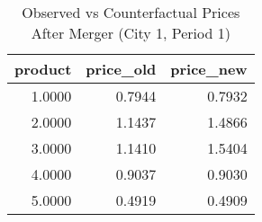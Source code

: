 \begin{table}[htbp]
    \centering
    \caption{Observed vs Counterfactual Prices After Merger (City 1, Period 1)}
    \label{tab:q11_prices_counterfactual_city1_period1}
\toprule
\begin{tabular}{rrr}
\toprule
product & price_old & price_new \\
\midrule
\midrule
1.0000 & 0.7944 & 0.7932 \\
2.0000 & 1.1437 & 1.4866 \\
3.0000 & 1.1410 & 1.5404 \\
4.0000 & 0.9037 & 0.9030 \\
5.0000 & 0.4919 & 0.4909 \\
\bottomrule
\bottomrule
\end{tabular}

\end{table}
